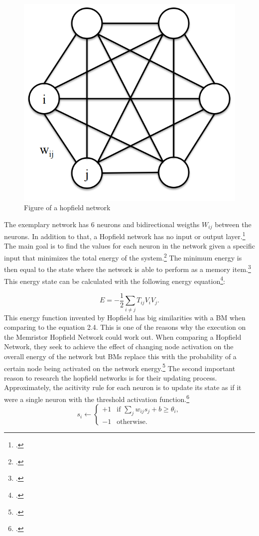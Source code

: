 \begin{figure}[H]
    \centering
    \includegraphics[width=0.3\linewidth]{graphics/Hopfield_Netzwerk.png}
    \caption{Figure of a hopfield network}
\end{figure}
The exemplary network has 6 neurons and bidirectional weigths \( W_{ij} \) between the neurons. 
In addition to that, a Hopfield network has no input or output layer.\footcite[cf.][3]{yaoMassivelyParallelAssociative2013}
The main goal is to find the values for each neuron in the network given a specific input that minimizes the total energy of the system.\footcite[cf.][7]{ahadNeuralNetworksWireless2016}
The minimum energy is then equal to the state where the network is able to perform as a memory item.\footcite[cf.][7]{ahadNeuralNetworksWireless2016}
This energy state can be calculated with the following energy equation\footcite[cf.][2556]{hopfieldNeuralNetworksPhysical1982}: 

\begin{equation}
    E = -\frac{1}{2} \sum_{i \neq j} T_{ij} V_i V_j .
\end{equation}
This energy function invented by Hopfield has big similarities with a \ac{BM} when comparing to the
equation 2.4. This is one of the reasons why the execution on the Memristor Hopfield Network could work out.
When comparing a Hopfield Network, they seek to achieve the effect of changing node activation on the overall energy of the network but \ac{BM}s replace this with the probability of a certain node being activated on the network energy.\footcite[cf.][7]{ahadNeuralNetworksWireless2016}
The second important reason to research the hopfield networks is for their updating process.
Approximately, the acitivity rule for each neuron is to update its state as if it were a single neuron with the threshold activation function.\footcite[cf.][506]{mackayInformationTheoryInference2003}
\[
s_i \leftarrow 
\begin{cases} 
+1 & \text{if } \sum_j w_{ij} s_j + b \geq \theta_i, \\
-1 & \text{otherwise}.
\end{cases}
\]


